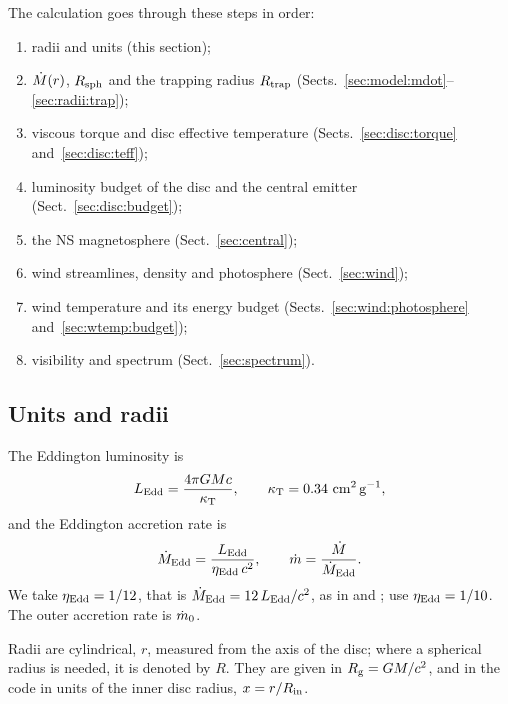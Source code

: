 The calculation goes through these steps in order:
\begin{enumerate}
\item radii and units (this section);
\item $\dot M(r)$, $R_{\rm sph}$ and the trapping radius $R_{\rm trap}$ (Sects.~\ref{sec:model:mdot}--\ref{sec:radii:trap});
\item viscous torque and disc effective temperature (Sects.~\ref{sec:disc:torque} and~\ref{sec:disc:teff});
\item luminosity budget of the disc and the central emitter (Sect.~\ref{sec:disc:budget});
\item the NS magnetosphere (Sect.~\ref{sec:central});
\item wind streamlines, density and photosphere (Sect.~\ref{sec:wind});
\item wind temperature and its energy budget (Sects.~\ref{sec:wind:photosphere} and~\ref{sec:wtemp:budget});
\item visibility and spectrum (Sect.~\ref{sec:spectrum}).
\end{enumerate}

\subsection{Units and radii}
\label{sec:model:units}

The Eddington luminosity is
\begin{equation}
L_{\rm Edd} = \frac{4\pi G M c}{\kappa_{\rm T}}, \qquad \kappa_{\rm T} = 0.34~{\rm cm^2\,g^{-1}},
\label{eq:LEdd}
\end{equation}
and the Eddington accretion rate is
\begin{equation}
\dot M_{\rm Edd} = \frac{L_{\rm Edd}}{\eta_{\rm Edd}\, c^2}, \qquad \dot m = \frac{\dot M}{\dot M_{\rm Edd}}.
\label{eq:MEdd}
\end{equation}
We take $\eta_{\rm Edd} = 1/12$, that is $\dot M_{\rm Edd} = 12\,L_{\rm Edd}/c^2$, as in \citet{Poutanen2007} and \citet{Lipunova1999}; \citet{Middleton2026} use $\eta_{\rm Edd} = 1/10$.
The outer accretion rate is $\dot m_0$.

Radii are cylindrical, $r$, measured from the axis of the disc; where a spherical radius is needed, it is denoted by $R$.
They are given in $R_{\rm g} = GM/c^2$, and in the code in units of the inner disc radius, $x = r/R_{\rm in}$.


